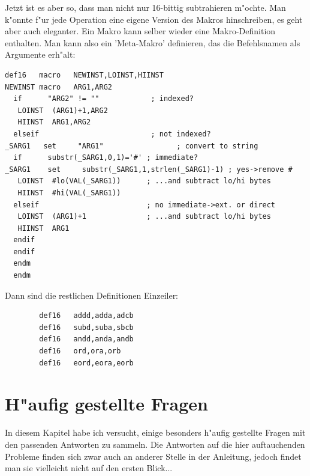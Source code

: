 \documentclass[12pt,a4paper,twoside]{report}
\begin{document}
Jetzt ist es aber so, dass man nicht nur 16-bittig subtrahieren m"ochte.  Man
k"onnte f"ur jede Operation eine eigene Version des Makros hinschreiben, es
geht aber auch eleganter.  Ein Makro kann selber wieder eine Makro-Definition
enthalten.  Man kann also ein 'Meta-Makro' definieren, das die Befehlsnamen
als Argumente erh"alt:
\begin{verbatim}
def16   macro   NEWINST,LOINST,HIINST
NEWINST macro   ARG1,ARG2
  if      "ARG2" != ""            ; indexed?
   LOINST  (ARG1)+1,ARG2
   HIINST  ARG1,ARG2
  elseif                          ; not indexed?
_SARG1   set     "ARG1"                 ; convert to string
  if      substr(_SARG1,0,1)='#' ; immediate?
_SARG1    set     substr(_SARG1,1,strlen(_SARG1)-1) ; yes->remove #
   LOINST  #lo(VAL(_SARG1))      ; ...and subtract lo/hi bytes
   HIINST  #hi(VAL(_SARG1))
  elseif                         ; no immediate->ext. or direct
   LOINST  (ARG1)+1              ; ...and subtract lo/hi bytes
   HIINST  ARG1
  endif
  endif
  endm
  endm
\end{verbatim}
Dann sind die restlichen Definitionen Einzeiler:
\begin{verbatim}
        def16   addd,adda,adcb
        def16   subd,suba,sbcb
        def16   andd,anda,andb
        def16   ord,ora,orb
        def16   eord,eora,eorb
\end{verbatim}


\cleardoublepage
\chapter{H"aufig gestellte Fragen}

In diesem Kapitel habe ich versucht, einige besonders h"aufig gestellte
Fragen mit den passenden Antworten zu sammeln.  Die Antworten auf
die hier auftauchenden Probleme finden sich zwar auch an anderer
Stelle in der Anleitung, jedoch findet man sie vielleicht nicht auf
den ersten Blick...
\end{document}
